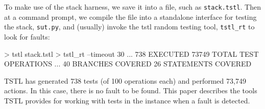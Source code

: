 To make use of the stack harness, we save it into a file, such
as {\tt stack.tstl}.  Then at a command prompt, we compile the file into
a standalone interface for testing the stack, {\tt sut.py}, and
(usually) invoke the tstl random testing tool, {\tt tstl\_rt} to look for faults:

{\scriptsize
\begin{code}
 > tstl stack.tstl
 > tstl\_rt --timeout 30
...
 738 EXECUTED
 73749 TOTAL TEST OPERATIONS
...
 40 BRANCHES COVERED
 26 STATEMENTS COVERED
\end{code}
}

TSTL has generated 738 tests (of 100 operations each) and performed
73,749 actions.  In this case, there is no fault to be found.  This
paper describes the tools TSTL provides for working with tests in the
instance when a fault is detected.
